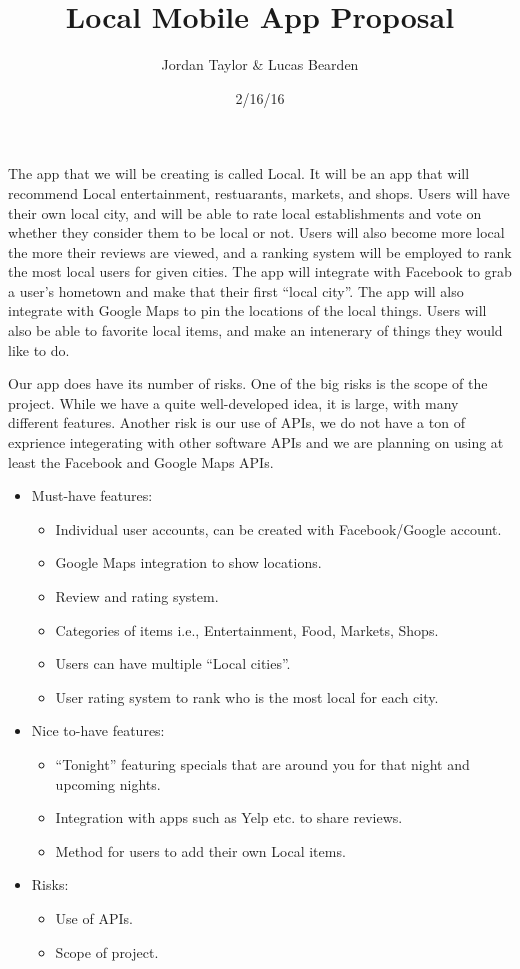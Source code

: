 \documentclass[11pt, oneside]{article}
\title{Local Mobile App Proposal}
\author{Jordan Taylor & Lucas Bearden}
\date{2/16/16}
\begin{document}
\maketitle
The app that we will be creating is called Local. It will be an app that will recommend Local entertainment, restuarants, markets, and shops. Users will have their own local city, and will be able to rate local establishments and vote on whether they consider them to be local or not. Users will also become more local the more their reviews are viewed, and a ranking system will be employed to rank the most local users for given cities. The app will integrate with Facebook to grab a user's hometown and make that their first ``local city''. The app will also integrate with Google Maps to pin the locations of the local things. Users will also be able to favorite local items, and make an intenerary of things they would like to do. 

Our app does have its number of risks. One of the big risks is the scope of the project. While we have a quite well-developed idea, it is large, with many different features. Another risk is our use of APIs, we do not have a ton of exprience integerating with other software APIs and we are planning on using at least the Facebook and Google Maps APIs.
\begin{itemize}
   \item Must-have features:
       \begin{itemize}
          \item Individual user accounts, can be created with Facebook/Google account.
          \item Google Maps integration to show locations.
          \item Review and rating system.
          \item Categories of items i.e., Entertainment, Food, Markets, Shops.
          \item Users can have multiple ``Local cities''.
          \item User rating system to rank who is the most local for each city.
       \end{itemize}  
   \item Nice to-have features:
       \begin{itemize}
          \item ``Tonight'' featuring specials that are around you for that night and upcoming nights.
          \item Integration with apps such as Yelp etc. to share reviews.
          \item Method for users to add their own Local items.
       \end{itemize}
   \item Risks:
       \begin{itemize}
          \item Use of APIs.
          \item Scope of project.
       \end{itemize} 
  \end{itemize}
\end{document}
